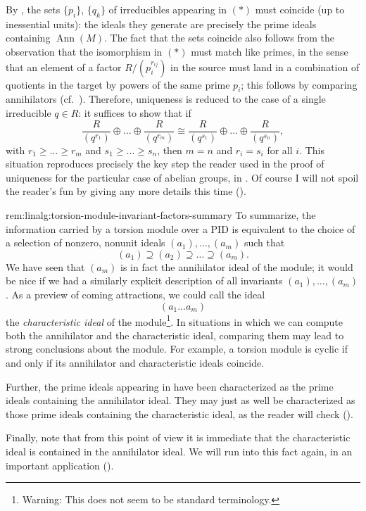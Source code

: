 By , the sets $\{p_i\}$, $\{q_k\}$ of irreducibles
appearing in $(*)$ must coincide (up to inessential units): the ideals
they generate are precisely the prime ideals containing
$\operatorname{Ann}(M)$. The fact that the sets coincide also follows
from the observation that the isomorphism in $(*)$ must match like
primes, in the sense that an element of a factor $R/(p_i^{r_{ij}})$ in
the source must land in a combination of quotients in the target by
powers of the same prime $p_i$; this follows by comparing annihilators
(cf.\
). Therefore,
uniqueness is reduced to the case of a single irreducible $q \in R$:
it suffices to show that if
\[
  \frac{R}{(q^{r_1})} \oplus \dots \oplus \frac{R}{(q^{r_m})} \cong
  \frac{R}{(q^{s_1})} \oplus \dots \oplus \frac{R}{(q^{s_n})},
\]
with $r_1 \geq \dots \geq r_m$ and $s_1 \geq \dots \geq s_n$, then
$m = n$ and $r_i = s_i$ for all $i$. This situation reproduces
precisely the key step the reader used in the proof of uniqueness for
the particular case of abelian groups, in
. Of course I will not
spoil the reader's fun by giving any more details this time
().

\begin{rem}{}{rem:linalg:torsion-module-invariant-factors-summary}
  To summarize, the information carried by a torsion module over a PID
  is equivalent to the choice of a selection of nonzero, nonunit
  ideals $(a_1), \dots, (a_m)$ such that
  \[
    (a_1) \supseteq (a_2) \supseteq \dots \supseteq (a_m).
  \]
  We have seen that $(a_m)$ is in fact the annihilator ideal of the
  module; it would be nice if we had a similarly explicit description
  of all invariants $(a_1), \dots, (a_m)$. As a preview of coming
  attractions, we could call the ideal
  \[
    (a_1 \dots a_m)
  \]
  the \emph{characteristic ideal} of the module\footnote{Warning: This
    does not seem to be standard terminology.}. In situations in which
  we can compute both the annihilator and the characteristic ideal,
  comparing them may lead to strong conclusions about the module. For
  example, a torsion module is cyclic if and only if its annihilator
  and characteristic ideals coincide.

  Further, the prime ideals appearing in  have been
  characterized as the prime ideals containing the annihilator ideal.
  They may just as well be characterized as those prime ideals
  containing the characteristic ideal, as the reader will check
  (\Cref{exer:linalg:primes-in-elem-divisors-contain-char-ideal}).

  Finally, note that from this point of view it is immediate that the
  characteristic ideal is contained in the annihilator ideal. We will
  run into this fact again, in an important application
  ().
\end{rem}

